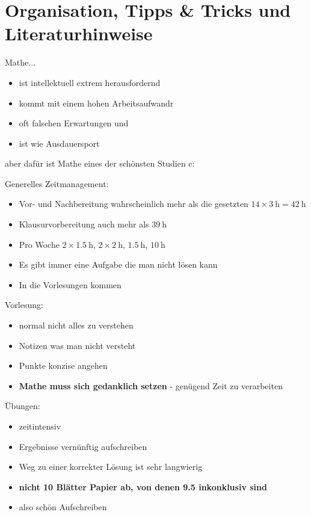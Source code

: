 \documentclass[consecutivenumbering]{gadsescript}
\begin{document}
\maketitle

\tableofcontents
\newpage

\section*{Organisation, Tipps \& Tricks und Literaturhinweise}

Mathe...
\begin{itemize}
	\item ist intellektuell extrem herausfordernd
	\item kommt mit einem hohen Arbeitsaufwandr
	\item oft falschen Erwartungen und
	\item ist wie Ausdauersport
\end{itemize}

aber dafür ist Mathe eines der  schönsten Studien c:

Generelles Zeitmanagement:
\begin{itemize}
	\item Vor- und Nachbereitung wahrscheinlich mehr als die gesetzten $14 \times \qty{3}{\hour} = \qty{42}{\hour}$
	\item Klausurvorbereitung auch mehr als $\qty{39}{\hour}$
	\item Pro Woche $ 2 \times \qty{1.5}{\hour}$, $2 \times \qty{2}{\hour} $, $ \qty{1.5}{\hour} $, $ \qty{10}{\hour} $
	\item Es gibt immer eine Aufgabe die man nicht lösen kann
	\item In die Vorlesungen kommen
\end{itemize}

Vorlesung:
\begin{itemize}
	\item normal nicht alles zu verstehen
	\item Notizen was man nicht versteht
	\item Punkte konzise angehen
	\item \textbf{Mathe muss sich gedanklich setzen} - genügend Zeit zu verarbeiten
\end{itemize}

Übungen:
\begin{itemize}
	\item zeitintensiv
	\item Ergebnisse vernünftig aufschreiben
	\item Weg zu einer korrekter Lösung ist sehr langwierig
	\item \textbf{nicht 10 Blätter Papier ab, von denen 9.5 inkonklusiv sind}
	\item also schön Aufschreiben
\end{itemize}
\end{document}
